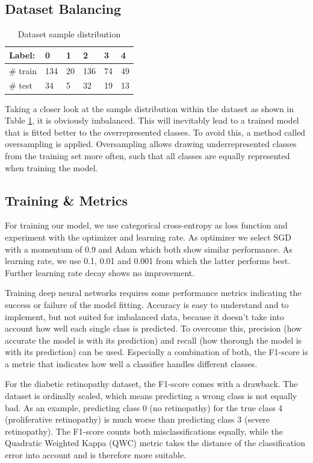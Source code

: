 \documentclass{article}
\begin{document}
\subsection{Dataset Balancing}
\renewcommand{\arraystretch}{1.2}
\begin{table}
  \vspace{-15pt}
  \centering
  \begin{tabular}{|l|l|l|l|l|l|}
  \hline
  Label:   & 0   & 1  & 2   & 3  & 4  \\ \hline \hline
  \# train & 134 & 20 & 136 & 74 & 49 \\ \hline
  \# test  & 34  & 5  & 32  & 19 & 13 \\ \hline
  \end{tabular}
  \caption{Dataset sample distribution} \label{tab:table1}
  \end{table}
Taking a closer look at the sample distribution within the dataset as shown in Table \ref{tab:table1}, it is obviously imbalanced. This will inevitably lead to a trained model
that is fitted better to the overrepresented classes.
To avoid this, a method called oversampling is applied. Oversampling allows drawing underrepresented classes from the training set more often, 
such that all classes are equally represented when training the model.
\pagebreak
\subsection{Training \& Metrics}
For training our model, we use categorical cross-entropy as loss function and experiment with the optimizer and 
learning rate. As optimizer we select SGD with a momentum of 0.9 and Adam which both show similar performance. 
As learning rate, we use 0.1, 0.01 and 0.001 from which the latter performs best. Further learning rate decay
shows no improvement.

Training deep neural networks requires some performance metrics indicating the success or failure of the model fitting. Accuracy
is easy to understand and to implement, but not suited for imbalanced data, because it doesn't take into account how well each 
single class is predicted. 
To overcome this, precision (how accurate the model is with its prediction) and recall (how thorough the model is with its prediction) can be used. 
Especially a combination of both, the F1-score is a metric that indicates how well a classifier handles different classes.

For the diabetic retinopathy dataset, the F1-score comes with a drawback. The dataset is ordinally scaled, which means predicting 
a wrong class is not equally bad. As an example, predicting class 0 (no retinopathy) for the true class 4 (proliferative retinopathy) 
is much worse than predicting class 3 (severe retinopathy). The F1-score counts both misclassifications equally, while the 
Quadratic Weighted Kappa (QWC) \cite{QWC} metric takes the distance of the classification error into account and is therefore more suitable.
\end{document}
